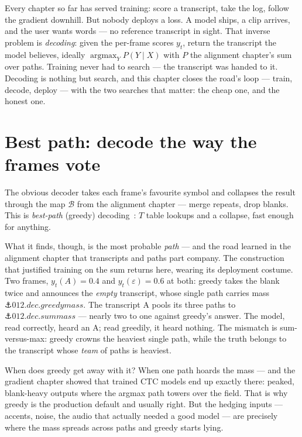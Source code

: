 \begin{narrative}
Every chapter so far has served training: score a transcript, take the
log, follow the gradient downhill. But nobody deploys a loss. A model
ships, a clip arrives, and the user wants words — no reference
transcript in sight. That inverse problem is \emph{decoding}: given the
per-frame scores $y_t$, return the transcript the model believes,
ideally $\operatorname*{argmax}_Y P(Y \mid X)$ with $P$ the alignment
chapter's sum over paths. Training never had to search — the transcript
was handed to it. Decoding is nothing but search, and this chapter
closes the road's loop — train, decode, deploy — with the two searches
that matter: the cheap one, and the honest one.

\section{Best path: decode the way the frames vote}

The obvious decoder takes each frame's favourite symbol and collapses
the result through the map $\mathcal{B}$ from the alignment chapter —
merge repeats, drop blanks. This is \emph{best-path} (greedy)
decoding~\cite{deep_learning-graves-et-al-2006-connectionist-temporal-classification}:
$T$ table lookups and a collapse, fast enough for anything.

What it finds, though, is the most probable \emph{path} — and the road
learned in the alignment chapter that transcripts and paths part
company. The construction that justified training on the sum returns
here, wearing its deployment costume. Two frames, $y_t(A) = 0.4$ and
$y_t(\varepsilon) = 0.6$ at both: greedy takes the blank twice and
announces the \emph{empty} transcript, whose single path carries mass
$\anchor{012.dec.greedymass}$. The transcript A pools its three paths
to $\anchor{012.dec.summass}$ — nearly two to one against greedy's
answer. The model, read correctly, heard an A; read greedily, it heard
nothing. The mismatch is sum-versus-max: greedy crowns the heaviest
single path, while the truth belongs to the transcript whose \emph{team}
of paths is heaviest.

When does greedy get away with it? When one path hoards the mass — and
the gradient chapter showed that trained CTC models end up exactly
there: peaked, blank-heavy outputs where the argmax path towers over
the field. That is why greedy is the production default and usually
right. But the hedging inputs — accents, noise, the audio that actually
needed a good model — are precisely where the mass spreads across
paths and greedy starts lying.


\end{narrative}
